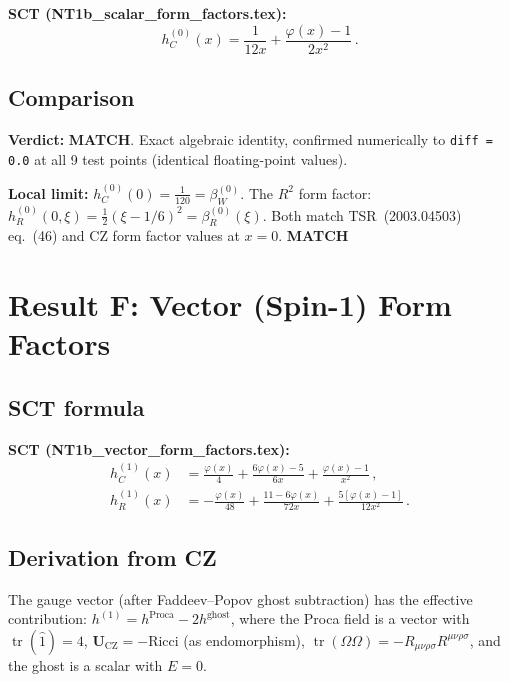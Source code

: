 \documentclass[12pt,a4paper]{article}
\theoremstyle{definition}
\theoremstyle{remark}
\newcommand{\tr}{\operatorname{tr}}
\newcommand{\Rsq}{R_{\mu\nu\rho\sigma}R^{\mu\nu\rho\sigma}}
\newcommand{\match}{\textcolor{green!60!black}{\textbf{MATCH}}}
\begin{document}
\noindent\textbf{SCT (NT1b\_scalar\_form\_factors.tex):}
\begin{equation}
  h_C^{(0)}(x) = \frac{1}{12x} + \frac{\varphi(x)-1}{2x^2}\,.
\end{equation}

\subsection{Comparison}

\textbf{Verdict:} \match.  Exact algebraic identity, confirmed numerically
to \texttt{diff = 0.0} at all 9 test points (identical floating-point values).

\medskip\noindent
\textbf{Local limit:}
$h_C^{(0)}(0) = \frac{1}{120} = \beta_W^{(0)}$.
The $R^2$ form factor:
$h_R^{(0)}(0,\xi) = \frac{1}{2}(\xi - 1/6)^2 = \beta_R^{(0)}(\xi)$.
Both match TSR~(2003.04503) eq.~(46) and CZ form factor values at $x=0$. \match


\section{Result F: Vector (Spin-1) Form Factors}
\label{sec:vector}

\subsection{SCT formula}

\noindent\textbf{SCT (NT1b\_vector\_form\_factors.tex):}
\begin{equation}
  \boxed{
  \begin{aligned}
  h_C^{(1)}(x) &= \frac{\varphi(x)}{4} + \frac{6\varphi(x)-5}{6x}
                   + \frac{\varphi(x)-1}{x^2}\,,\\[4pt]
  h_R^{(1)}(x) &= -\frac{\varphi(x)}{48}
                   + \frac{11-6\varphi(x)}{72x}
                   + \frac{5[\varphi(x)-1]}{12x^2}\,.
  \end{aligned}
  }
\end{equation}

\subsection{Derivation from CZ}

The gauge vector (after Faddeev--Popov ghost subtraction) has the
effective contribution:
$h^{(1)} = h^{\text{Proca}} - 2 h^{\text{ghost}}$,
where the Proca field is a vector with
$\tr(\hat{1}) = 4$, $\mathbf{U}_{\text{CZ}} = -\text{Ricci}$ (as endomorphism),
$\tr(\Omega\Omega) = -\Rsq$,
and the ghost is a scalar with $E = 0$.
\end{document}
